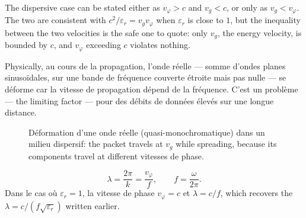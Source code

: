 \begin{remark}
  The dispersive case can be stated either as $v_\varphi > c$ and $v_g < c$, or
  only as $v_g < v_\varphi$. The two are consistent with
  $c^2/\varepsilon_r = v_g v_\varphi$ when $\varepsilon_r$ is close to $1$, but
  the inequality between the two velocities is the safe one to quote: only
  $v_g$, the energy
  velocity, is bounded by $c$, and $v_\varphi$ exceeding $c$ violates nothing.
\end{remark}

Physically, au cours de la propagation, l'onde réelle --- somme d'ondes planes
sinusoïdales, sur une bande de fréquence couverte étroite mais pas nulle --- se
déforme car la vitesse de propagation dépend de la fréquence. C'est un problème
--- the limiting factor --- pour des débits de données élevés sur une longue
distance.

\begin{figure}[h!]
  \centering
  \caption*{\small Déformation d'une onde réelle (quasi-monochromatique) dans un
  milieu dispersif: the packet travels at $v_g$ while spreading, because its
  components travel at different vitesses de phase.}
\end{figure}

\begin{definition}
  \[
    \lambda = \frac{2\pi}{k} = \frac{v_\varphi}{f},
    \qquad f = \frac{\omega}{2\pi}.
  \]
  Dans le cas où $\varepsilon_r = 1$, la vitesse de phase $v_\varphi = c$ et
  $\lambda = c/f$, which recovers the $\lambda = c/(f\sqrt{\varepsilon_r})$
  written earlier.
\end{definition}

